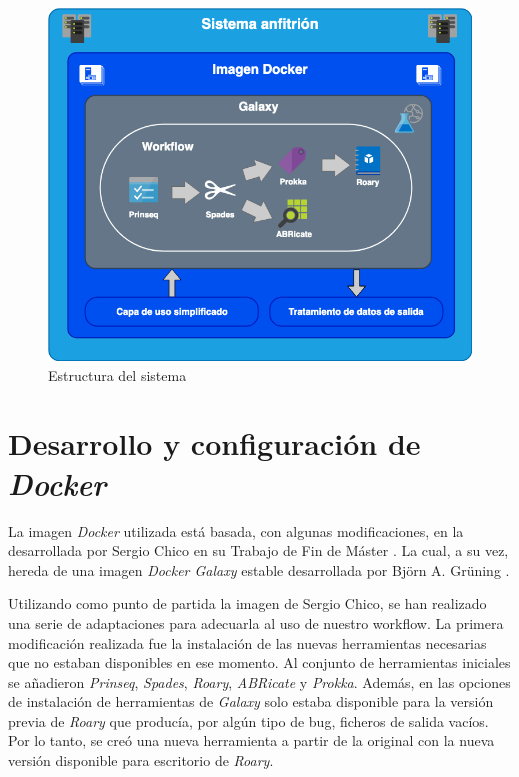 \begin{figure}
    \begin{center}
      \includegraphics[scale=0.5]{images/DiagramaDelSistema.png}
      \caption{Estructura del sistema}
      \label{fig:DiagramaDelSistema}
    \end{center}
\end{figure}
\section{Desarrollo y configuración de \itshape{Docker}}
La imagen \textit{Docker} utilizada está basada, con algunas modificaciones, en la desarrollada por Sergio Chico en su Trabajo de Fin de Máster \cite{Chico2018}. La cual, a su vez, hereda de una imagen \textit{Docker Galaxy} estable desarrollada por Björn A. Grüning \cite{GalaxyDocker}.

Utilizando como punto de partida la imagen de Sergio Chico, se han realizado una serie de adaptaciones para adecuarla al uso de nuestro workflow. La primera modificación realizada fue la instalación de las nuevas herramientas necesarias que no estaban disponibles en ese momento. Al conjunto de herramientas iniciales se añadieron \textit{Prinseq}, \textit{Spades}, \textit{Roary}, \textit{ABRicate} y \textit{Prokka}. Además, en las opciones de instalación de herramientas de \textit{Galaxy} solo estaba disponible para la versión previa de \textit{Roary} que producía, por algún tipo de bug, ficheros de salida vacíos. Por lo tanto, se creó una nueva herramienta a partir de la original con la nueva versión disponible para escritorio de \textit{Roary}.

